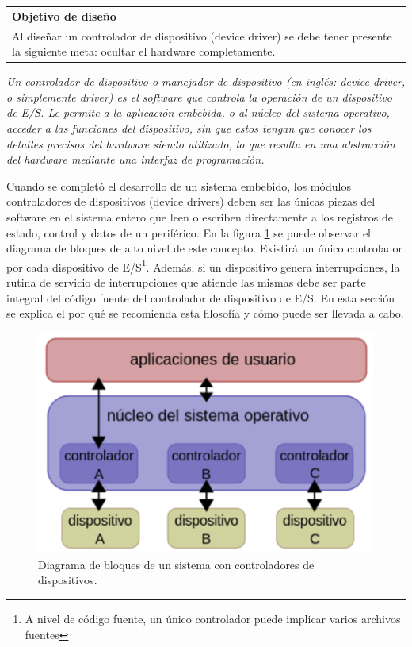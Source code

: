 \documentclass[output=paper, 
colorlinks,
citecolor=brown,
newtxmath
]{langscibook}
\begin{document}
\begin{center}
\begin{tabularx}{\textwidth}{|X|}
\hline
\rowcolor{aliceblue}
\textbf{Objetivo de diseño}\\
Al diseñar un controlador de dispositivo (device driver) se debe
tener presente la siguiente meta: ocultar el hardware completamente.\\
\hline
\end{tabularx}
\end{center}

\textit{Un controlador de dispositivo o manejador de dispositivo (en inglés: device driver, o simplemente driver) es el software que controla la operación de un dispositivo de E/S. 
Le permite a la aplicación embebida, o al núcleo del sistema operativo, acceder a 
las funciones del dispositivo, sin que estos tengan que conocer los detalles 
precisos del hardware siendo utilizado, lo que resulta en una abstracción del 
hardware mediante una interfaz de programación.}

Cuando se completó el desarrollo de un sistema embebido, los
módulos controladores de dispositivos (device drivers) deben ser 
las únicas piezas del software en el sistema entero que leen o escriben 
directamente a los registros de estado, control y datos de un periférico. 
En la figura \ref{fig:controladores} se puede observar el diagrama de bloques de alto nivel 
de este concepto.
Existirá un único controlador por cada dispositivo de E/S\footnote{A nivel de 
código fuente, un único controlador puede implicar varios archivos fuentes}.
Además, si un dispositivo genera interrupciones, la rutina de servicio 
de interrupciones que atiende las mismas debe ser parte integral 
del código fuente del controlador de dispositivo de E/S.
En esta sección se explica el por qué se recomienda esta filosofía y cómo
puede ser llevada a cabo.

\begin{figure}
\includegraphics[scale=0.60]{images/controlador.png}
\caption{Diagrama de bloques de un sistema con controladores de dispositivos.}
\label{fig:controladores}
\end{figure}
\end{document}

